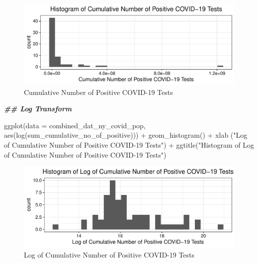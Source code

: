 \documentclass[
  12pt,
]{article}
\newenvironment{Shaded}{\begin{snugshade}}{\end{snugshade}}
\newcommand{\AttributeTok}[1]{\textcolor[rgb]{0.77,0.63,0.00}{#1}}
\newcommand{\DocumentationTok}[1]{\textcolor[rgb]{0.56,0.35,0.01}{\textbf{\textit{#1}}}}
\newcommand{\FunctionTok}[1]{\textcolor[rgb]{0.00,0.00,0.00}{#1}}
\newcommand{\NormalTok}[1]{#1}
\newcommand{\SpecialCharTok}[1]{\textcolor[rgb]{0.00,0.00,0.00}{#1}}
\newcommand{\StringTok}[1]{\textcolor[rgb]{0.31,0.60,0.02}{#1}}
\begin{document}
\begin{figure}

\includegraphics{EDA_Final_Group_Project_files/figure-latex/unnamed-chunk-4-1} \hfill{}

\caption{Cumulative Number of Positive COVID-19 Tests}\label{fig:unnamed-chunk-4}
\end{figure}

\begin{Shaded}
\begin{Highlighting}[]
\DocumentationTok{\#\# Log Transform}

\FunctionTok{ggplot}\NormalTok{(}\AttributeTok{data =}\NormalTok{ combined\_dat\_ny\_covid\_pop, }\FunctionTok{aes}\NormalTok{(}\FunctionTok{log}\NormalTok{(sum\_cumulative\_no\_of\_positive))) }\SpecialCharTok{+}
  \FunctionTok{geom\_histogram}\NormalTok{() }\SpecialCharTok{+}
  \FunctionTok{xlab}\NormalTok{ (}\StringTok{"Log of Cumulative Number of Positive COVID{-}19 Tests"}\NormalTok{) }\SpecialCharTok{+}
  \FunctionTok{ggtitle}\NormalTok{(}\StringTok{"Histogram of Log of Cumulative Number of Positive COVID{-}19 Tests"}\NormalTok{)}
\end{Highlighting}
\end{Shaded}

\begin{figure}

\includegraphics{EDA_Final_Group_Project_files/figure-latex/unnamed-chunk-5-1} \hfill{}

\caption{Log of Cumulative Number of Positive COVID-19 Tests}\label{fig:unnamed-chunk-5}
\end{figure}
\end{document}
